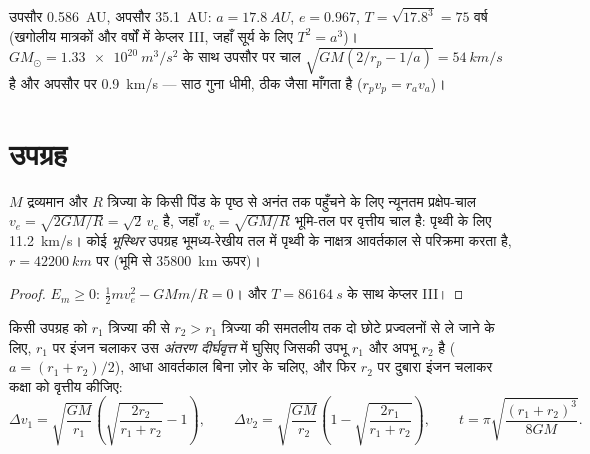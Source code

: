 \begin{example}[हैली का धूमकेतु]\label{ex:b1:central-forces:halley}
उपसौर \qty{0.586}{AU}, अपसौर \qty{35.1}{AU}: $a = \qty{17.8}{AU}$,
$e = 0.967$, $T = \sqrt{17.8^3} = 75$ वर्ष (खगोलीय मात्रकों और
वर्षों में केप्लर III, जहाँ सूर्य के लिए $T^2 = a^3$)।
$GM_\odot = \qty{1.33e20}{m^3/s^2}$ के साथ उपसौर पर चाल
$\sqrt{GM(2/r_p - 1/a)} = \qty{54}{km/s}$ है और अपसौर पर \qty{0.9}{km/s}
--- साठ गुना धीमी, ठीक जैसा  माँगता है ($r_pv_p = r_av_a$)।
\end{example}

\section{उपग्रह}

\begin{proposition}[पलायन वेग; भूस्थिर कक्षा]\label{prop:b1:central-forces:escape}
$M$ द्रव्यमान और $R$ त्रिज्या के किसी पिंड के पृष्ठ से अनंत तक पहुँचने के
लिए न्यूनतम प्रक्षेप-चाल $v_e = \sqrt{2GM/R} = \sqrt2\,v_c$ है, जहाँ
$v_c = \sqrt{GM/R}$ भूमि-तल पर वृत्तीय चाल है: पृथ्वी के लिए
\qty{11.2}{km/s}। कोई \emph{भूस्थिर} उपग्रह भूमध्य-रेखीय तल में पृथ्वी के
नाक्षत्र आवर्तकाल से परिक्रमा करता है, $r = \qty{42200}{km}$ पर (भूमि से
\qty{35800}{km} ऊपर)।
\end{proposition}

\begin{proof}
$E_m \geq 0$: $\tfrac12 mv_e^2 - GMm/R = 0$। और $T = \qty{86164}{s}$ के साथ केप्लर III।
\end{proof}

\begin{proposition}[होमान अंतरण]\label{prop:b1:central-forces:hohmann}
किसी उपग्रह को $r_1$ त्रिज्या की  से $r_2 > r_1$ त्रिज्या की
समतलीय  तक दो छोटे प्रज्वलनों से ले जाने के लिए, $r_1$ पर
इंजन चलाकर उस \emph{अंतरण दीर्घवृत्त} में घुसिए जिसकी उपभू $r_1$ और अपभू
$r_2$ है ($a = (r_1 + r_2)/2$), आधा आवर्तकाल बिना ज़ोर के चलिए, और फिर
$r_2$ पर दुबारा इंजन चलाकर कक्षा को वृत्तीय कीजिए:
\[
\Delta v_1 = \sqrt{\frac{GM}{r_1}}\left(\sqrt{\frac{2r_2}{r_1 + r_2}} - 1\right),
\qquad
\Delta v_2 = \sqrt{\frac{GM}{r_2}}\left(1 - \sqrt{\frac{2r_1}{r_1 + r_2}}\right),
\qquad
t = \pi\sqrt{\frac{(r_1 + r_2)^3}{8GM}} .
\]
\end{proposition}

